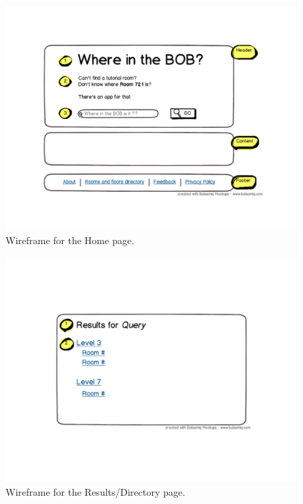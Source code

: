 \begin{figure}
                \includegraphics[scale=0.35]{img/wireframes/home.pdf}
                \caption{Wireframe for the Home page.}
                \label{img:wireframes-home}
\end{figure}
\begin{figure}
                \includegraphics[scale=0.35]{img/wireframes/results.pdf}
                \caption{Wireframe for the Results/Directory page.}
                \label{img:wireframes-results}
\end{figure}
